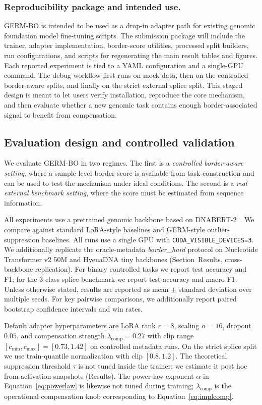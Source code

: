 \documentclass[12pt,letterpaper]{article}
\newcommand{\splitname}[1]{\textit{#1}}
\begin{document}
\subsubsection*{Reproducibility package and intended use.}
GERM-BO is intended to be used as a drop-in adapter path for existing genomic foundation model fine-tuning scripts. The submission package will include the trainer, adapter implementation, border-score utilities, processed split builders, run configurations, and scripts for regenerating the main result tables and figures. Each reported experiment is tied to a YAML configuration and a single-GPU command. The debug workflow first runs on mock data, then on the controlled border-aware splits, and finally on the strict external splice split. This staged design is meant to let users verify installation, reproduce the core mechanism, and then evaluate whether a new genomic task contains enough border-associated signal to benefit from compensation.

\subsection*{Evaluation design and controlled validation}

We evaluate GERM-BO in two regimes. The first is a \emph{controlled border-aware setting}, where a sample-level border score is available from task construction and can be used to test the mechanism under ideal conditions. The second is a \emph{real external benchmark setting}, where the score must be estimated from sequence information.

All experiments use a pretrained genomic backbone based on DNABERT-2~\cite{dnabert22023}. We compare against standard LoRA-style baselines and GERM-style outlier-suppression baselines. All runs use a single GPU with \texttt{CUDA\_VISIBLE\_DEVICES=3}. We additionally replicate the oracle-metadata \splitname{border\_hard} protocol on Nucleotide Transformer v2 50M and HyenaDNA tiny backbones (Section~Results, cross-backbone replication). For binary controlled tasks we report test accuracy and F1; for the 3-class splice benchmark we report test accuracy and macro-F1. Unless otherwise stated, results are reported as mean $\pm$ standard deviation over multiple seeds. For key pairwise comparisons, we additionally report paired bootstrap confidence intervals and win rates.

Default adapter hyperparameters are LoRA rank $r=8$, scaling $\alpha=16$, dropout $0.05$, and compensation strength $\lambda_{\mathrm{comp}}=0.27$ with clip range $[c_{\min},c_{\max}]=[0.73,1.42]$ on controlled metadata runs. On the strict splice split we use train-quantile normalization with clip $[0.8,1.2]$. The theoretical suppression threshold $\tau$ is not tuned inside the trainer; we estimate it post hoc from activation snapshots (Results). The power-law exponent $\alpha$ in Equation~\eqref{eq:powerlaw} is likewise not tuned during training; $\lambda_{\mathrm{comp}}$ is the operational compensation knob corresponding to Equation~\eqref{eq:implcomp}.
\end{document}
